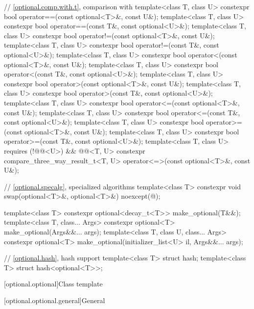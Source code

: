 \begin{codeblock}
{  // \ref{optional.comp.with.t}, comparison with 
  template<class T, class U> constexpr bool operator==(const optional<T>&, const U&);
  template<class T, class U> constexpr bool operator==(const T&, const optional<U>&);
  template<class T, class U> constexpr bool operator!=(const optional<T>&, const U&);
  template<class T, class U> constexpr bool operator!=(const T&, const optional<U>&);
  template<class T, class U> constexpr bool operator<(const optional<T>&, const U&);
  template<class T, class U> constexpr bool operator<(const T&, const optional<U>&);
  template<class T, class U> constexpr bool operator>(const optional<T>&, const U&);
  template<class T, class U> constexpr bool operator>(const T&, const optional<U>&);
  template<class T, class U> constexpr bool operator<=(const optional<T>&, const U&);
  template<class T, class U> constexpr bool operator<=(const T&, const optional<U>&);
  template<class T, class U> constexpr bool operator>=(const optional<T>&, const U&);
  template<class T, class U> constexpr bool operator>=(const T&, const optional<U>&);
  template<class T, class U>
    requires (!@@<U>) && @@<T, U>
    constexpr compare_three_way_result_t<T, U>
      operator<=>(const optional<T>&, const U&);

  // \ref{optional.specalg}, specialized algorithms
  template<class T>
    constexpr void swap(optional<T>&, optional<T>&) noexcept(@\seebelow@);

  template<class T>
    constexpr optional<decay_t<T>> make_optional(T&&);
  template<class T, class... Args>
    constexpr optional<T> make_optional(Args&&... args);
  template<class T, class U, class... Args>
    constexpr optional<T> make_optional(initializer_list<U> il, Args&&... args);

  // \ref{optional.hash}, hash support
  template<class T> struct hash;
  template<class T> struct hash<optional<T>>;
}
\end{codeblock}

[optional.optional]{Class template }

[optional.optional.general]{General}

